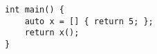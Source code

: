\begin{lstlisting}[title=\href{https://godbolt.org/z/1T8zYE}{\texttt{godbolt.org/z/1T8zYE}}]
int main() {
    auto x = [] { return 5; };
    return x();
}
\end{lstlisting}
